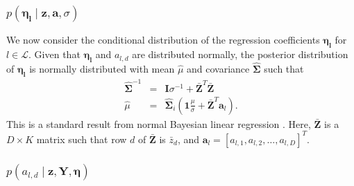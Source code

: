 \subsubsection{$p\left(\mathbf{\eta_{l}}\mid\mathbf{z},\mathbf{a},\sigma\right)$}

We now consider the conditional distribution of the regression coefficients
$\mathbf{\eta_{l}}$ for $l\in\mathcal{L}$. Given that $\mathbf{\eta_{l}}$
and $a_{l,d}$ are distributed normally, the posterior distribution
of $\mathbf{\eta_{l}}$ is normally distributed with mean $\hat{\mu}$
and covariance $\hat{\mathbf{\Sigma}}$ such that %
\begin{eqnarray}
\hat{\mathbf{\Sigma}}^{-1} & = & \mathbf{I}\sigma^{-1}+\bar{\mathbf{Z}}^{T}\bar{\mathbf{Z}}\\
\hat{\mu} & = & \hat{\mathbf{\Sigma}}_{i}\left(\mathbf{1}\frac{\mu}{\sigma}+\bar{\mathbf{Z}}^{T}\mathbf{a}_{l}\right).\end{eqnarray}
 This is a standard result from normal Bayesian linear regression
\citep{BishopPRML}. Here, $\bar{\mathbf{Z}}$ is a $D\times K$ matrix
such that row $d$ of $\mathbf{\bar{Z}}$ is $\bar{z}_{d}$, and $\mathbf{a}_{l}=[a_{l,1},a_{l,2},\ldots,a_{l,D}]^{T}$.



\subsubsection{$p\left(a_{l,d}\mid\mathbf{z},\mathbf{Y},\mathbf{\eta}\right)$}

